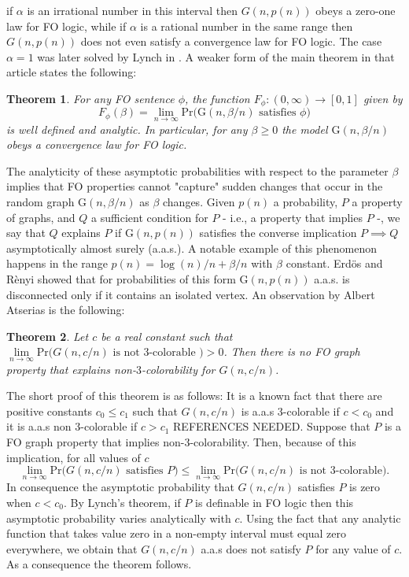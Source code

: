 \documentclass[12pt,notitlepage,a4paper]{article}
\newtheorem{theorem}{Theorem}[section]
\theoremstyle{definition}
\newcommand{\Ln}{\lim\limits_{n\to \infty}}
\begin{document}
if $\alpha$ is an irrational number in this interval then
$G(n,p(n))$ obeys a zero-one law for FO logic, while if $\alpha$
is a rational number in the same range then $G(n,p(n))$ does not
even satisfy a convergence law for FO logic. The case $\alpha=1$
was later solved by Lynch in \cite{lynch1992probabilities}. A weaker
form of the main theorem in that article states the following:
\begin{theorem} 
	For any FO sentence $\phi$, the function
	$F_\phi: (0,\infty)\rightarrow [0,1]$ given by 
	\[ F_\phi(\beta) = \Ln \mathrm{Pr}\big( \mathrm{G}(n,\beta/n)
	\text{ satisfies } \phi   \big) \]
	is well defined and analytic. In particular, for any
	$\beta \geq 0$ the model $\mathrm{G}(n,\beta/n)$
	obeys a convergence law for FO logic. 
\end{theorem}

The analyticity of these asymptotic probabilities with respect to 
the parameter $\beta$ implies that FO properties cannot "capture" sudden
changes that occur in the random graph $\mathrm{G}(n,\beta/n)$
as $\beta$ changes. Given $p(n)$ a probability, $P$ a property of graphs,
and $Q$ a sufficient condition for $P$ - i.e., a property that 
implies $P$ -, we say that $Q$ explains $P$ if $\mathrm{G}(n,p(n))$ satisfies 
the converse implication $P \implies Q$ asymptotically almost surely
(a.a.s.). A notable example of this phenomenon happens in the range 
$p(n)= \log(n)/n + \beta/n$ with $\beta$ constant. Erd\"os and R\`enyi
\cite{erdHos1960evolution} 
showed that for probabilities of this form $\mathrm{G}(n,p(n))$ 
a.a.s. is disconnected only if it contains an isolated vertex. 
An observation by Albert Atserias is the following:

\begin{theorem}
Let $c$ be a real constant such that 
$\Ln \mathrm{Pr}\big( G(n, c/n) 
\text{ is not }	3\text{-colorable }\big)> 0$.  
Then there is no FO graph property that explains 
non-$3$-colorability for $G(n, c/n)$.
\end{theorem}

The short proof of this theorem is as follows: 
It is a known fact that there are positive constants
$c_0\leq c_1$ such that $G(n, c/n)$ is a.a.s $3$-colorable
if $c<c_0$ and it is a.a.s non $3$-colorable if $c>c_1$ 
REFERENCES NEEDED.
Suppose that $P$ is a FO graph property that implies
non-$3$-colorability. Then, because of this implication,
for all values of $c$
\[\Ln \mathrm{Pr}\big( G(n, c/n) 
\text{ satisfies } P \big) \leq \Ln \mathrm{Pr}\big( G(n, c/n) 
\text{ is not }	3\text{-colorable}\big).\]
In consequence the asymptotic probability that $G(n,c/n)$ 
satisfies $P$ is zero when $c<c_0$. By Lynch's theorem, if 
$P$ is definable in FO logic then this asymptotic probability
varies analytically with $c$. Using the fact that any analytic 
function that takes value zero in a non-empty interval must 
equal zero everywhere, we obtain that $G(n,c/n)$ a.a.s does 
not satisfy $P$ for any value of $c$. 
As a consequence the theorem follows.  \par
\end{document}

